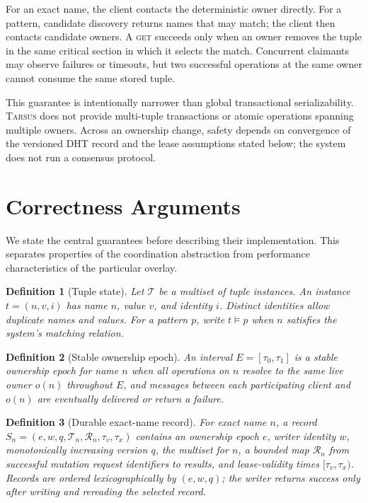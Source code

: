 \documentclass[conference]{IEEEtran}
\newcommand{\system}{\textsc{Tarsus}\xspace}
\newcommand{\getop}{\textsc{get}\xspace}
\newtheorem{definition}{Definition}
\begin{document}
For an exact name, the client contacts the deterministic owner directly. For a
pattern, candidate discovery returns names that may match; the client then
contacts candidate owners. A \getop succeeds only when an owner removes the
tuple in the same critical section in which it selects the match. Concurrent
claimants may observe failures or timeouts, but two successful operations at
the same owner cannot consume the same stored tuple.

This guarantee is intentionally narrower than global transactional
serializability. \system does not provide multi-tuple transactions or atomic
operations spanning multiple owners. Across an ownership change, safety
depends on convergence of the versioned DHT record and the lease assumptions
stated below; the system does not run a consensus protocol.

\section{Correctness Arguments}
\label{sec:correctness}

We state the central guarantees before describing their implementation. This
separates properties of the coordination abstraction from performance
characteristics of the particular overlay.

\begin{definition}[Tuple state]
Let $\mathcal{T}$ be a multiset of tuple instances. An instance
$t=(n,v,i)$ has name $n$, value $v$, and identity $i$. Distinct identities
allow duplicate names and values. For a pattern $p$, write $t \models p$ when
$n$ satisfies the system's matching relation.
\end{definition}

\begin{definition}[Stable ownership epoch]
An interval $E=[\tau_0,\tau_1]$ is a stable ownership epoch for name $n$ when
all operations on $n$ resolve to the same live owner $o(n)$ throughout $E$,
and messages between each participating client and $o(n)$ are eventually
delivered or return a failure.
\end{definition}

\begin{definition}[Durable exact-name record]
For exact name $n$, a record
$S_n=(e,w,q,\mathcal{T}_n,\mathcal{R}_n,\tau_v,\tau_x)$ contains an ownership
epoch $e$, writer identity $w$, monotonically increasing version $q$, the
multiset for $n$, a bounded map $\mathcal{R}_n$ from successful mutation
request identifiers to results, and lease-validity times
$[\tau_v,\tau_x)$. Records are ordered lexicographically by $(e,w,q)$; the
writer returns success only after writing and rereading the selected record.
\end{definition}
\end{document}
